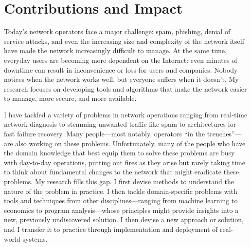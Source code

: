 \section*{Contributions and Impact}

Today's network operators face a major challenge: spam, phishing, denial
of service attacks, and even the increasing size and complexity of the
network itself have made the network increasingly difficult to
manage. At the same time, everyday users are becoming more dependent on
the Internet: even minutes of downtime can result in inconvenience or
loss for users and companies.  Nobody notices when the network works
well, but everyone suffers when it doesn't.  My research focuses on
developing tools and algorithms that make the network easier to manage,
more secure, and more available.

I have tackled a variety of problems in network operations ranging from
real-time network diagnosis to stemming unwanted traffic like spam to
architectures for fast failure recovery.  Many people---most notably,
operators ``in the trenches''---are also working on these problems.
Unfortunately, many of the people who have the domain knowledge that
best equip them to solve these problems are busy with day-to-day
operations, putting out fires as they arise but rarely taking time to
think about fundamental changes to the network that might eradicate
these problems.  My research fills this gap.  I first devise methods to
understand the nature of the problem in practice.  I then tackle
domain-specific problems with tools and techniques from other
disciplines---ranging from machine learning to economics to program
analysis---whose principles might provide insights into a new,
previously undiscovered solution.  I then devise a new approach or
solution, and I transfer it to practice through implementation and
deployment of real-world systems.


